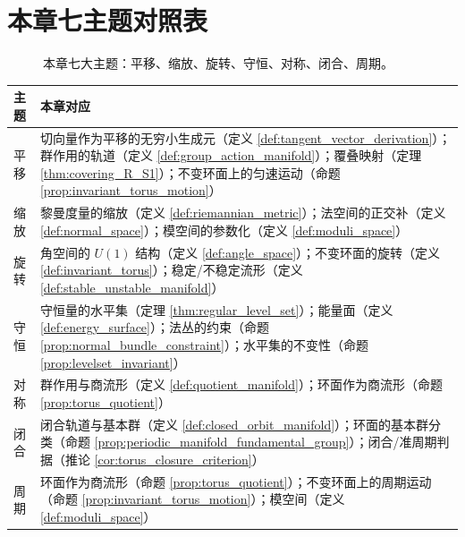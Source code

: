 \section*{本章七主题对照表}

\begin{figure}[htbp]
\centering
{}
\caption{本章七大主题：平移、缩放、旋转、守恒、对称、闭合、周期。}
\label{fig:manifold_themes}
\end{figure}

\begin{center}
\renewcommand{\arraystretch}{1.3}
\begin{tabular}{>{\centering\arraybackslash}p{2.2cm}>{\centering\arraybackslash}p{10.5cm}}
\toprule
主题 & 本章对应 \\
\midrule
平移 & 切向量作为平移的无穷小生成元（定义 \ref{def:tangent_vector_derivation}）；群作用的轨道（定义 \ref{def:group_action_manifold}）；覆叠映射（定理 \ref{thm:covering_R_S1}）；不变环面上的匀速运动（命题 \ref{prop:invariant_torus_motion}） \\
缩放 & 黎曼度量的缩放（定义 \ref{def:riemannian_metric}）；法空间的正交补（定义 \ref{def:normal_space}）；模空间的参数化（定义 \ref{def:moduli_space}） \\
旋转 & 角空间的 $U(1)$ 结构（定义 \ref{def:angle_space}）；不变环面的旋转（定义 \ref{def:invariant_torus}）；稳定/不稳定流形（定义 \ref{def:stable_unstable_manifold}） \\
守恒 & 守恒量的水平集（定理 \ref{thm:regular_level_set}）；能量面（定义 \ref{def:energy_surface}）；法丛的约束（命题 \ref{prop:normal_bundle_constraint}）；水平集的不变性（命题 \ref{prop:levelset_invariant}） \\
对称 & 群作用与商流形（定义 \ref{def:quotient_manifold}）；环面作为商流形（命题 \ref{prop:torus_quotient}） \\
闭合 & 闭合轨道与基本群（定义 \ref{def:closed_orbit_manifold}）；环面的基本群分类（命题 \ref{prop:periodic_manifold_fundamental_group}）；闭合/准周期判据（推论 \ref{cor:torus_closure_criterion}） \\
周期 & 环面作为商流形（命题 \ref{prop:torus_quotient}）；不变环面上的周期运动（命题 \ref{prop:invariant_torus_motion}）；模空间（定义 \ref{def:moduli_space}） \\
\bottomrule
\end{tabular}
\end{center}

